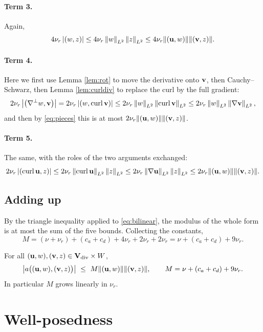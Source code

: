 \documentclass[11pt,a4paper]{article}
\begin{document}
\paragraph{Term 3.} Again,
\[
  4\nu_{r}\left\lvert \left( w , z \right) \right\rvert
  \le 4\nu_{r} \left\lVert w \right\rVert_{L^{2}}\left\lVert z \right\rVert_{L^{2}}
  \le 4\nu_{r} \lVert (\mathbf{u},w) \rVert \lVert (\mathbf{v},z) \rVert .
\]

\paragraph{Term 4.} Here we first use Lemma \ref{lem:rot} to move the derivative
onto $\mathbf{v}$, then Cauchy--Schwarz, then Lemma \ref{lem:curldiv} to replace the
curl by the full gradient:
\[
  2\nu_{r}\left\lvert \left( \nabla^{\perp} w , \mathbf{v} \right) \right\rvert
  = 2\nu_{r}\left\lvert \left( w , \operatorname{curl} \mathbf{v} \right) \right\rvert
  \le 2\nu_{r} \left\lVert w \right\rVert_{L^{2}}\left\lVert \operatorname{curl} \mathbf{v} \right\rVert_{L^{2}}
  \le 2\nu_{r} \left\lVert w \right\rVert_{L^{2}}\left\lVert \nabla \mathbf{v} \right\rVert_{L^{2}} ,
\]
and then by \eqref{eq:pieces} this is at most
$2\nu_{r} \lVert (\mathbf{u},w) \rVert \lVert (\mathbf{v},z) \rVert$.

\paragraph{Term 5.} The same, with the roles of the two arguments exchanged:
\[
  2\nu_{r}\left\lvert \left( \operatorname{curl} \mathbf{u} , z \right) \right\rvert
  \le 2\nu_{r} \left\lVert \operatorname{curl} \mathbf{u} \right\rVert_{L^{2}}\left\lVert z \right\rVert_{L^{2}}
  \le 2\nu_{r} \left\lVert \nabla \mathbf{u} \right\rVert_{L^{2}}\left\lVert z \right\rVert_{L^{2}}
  \le 2\nu_{r} \lVert (\mathbf{u},w) \rVert \lVert (\mathbf{v},z) \rVert .
\]

\subsection{Adding up}

By the triangle inequality applied to \eqref{eq:bilinear}, the modulus of the
whole form is at most the sum of the five bounds. Collecting the constants,
\[
  M = (\nu + \nu_{r}) + (c_{a}+c_{d}) + 4\nu_{r} + 2\nu_{r} + 2\nu_{r}
  = \nu + (c_{a}+c_{d}) + 9\nu_{r} .
\]

\begin{theorem}[Boundedness]\label{thm:boundedness}
For all $(\mathbf{u},w), (\mathbf{v},z) \in \mathbf{V}_{\mathrm{div}} \times W$,
\[
  \left\lvert a\big( (\mathbf{u},w),(\mathbf{v},z) \big) \right\rvert
  \ \le\ M \lVert (\mathbf{u},w) \rVert \lVert (\mathbf{v},z) \rVert ,
  \qquad
  M = \nu + (c_{a}+c_{d}) + 9\nu_{r} .
\]
In particular $M$ grows linearly in $\nu_{r}$.
\end{theorem}

\section{Well-posedness}
\end{document}
